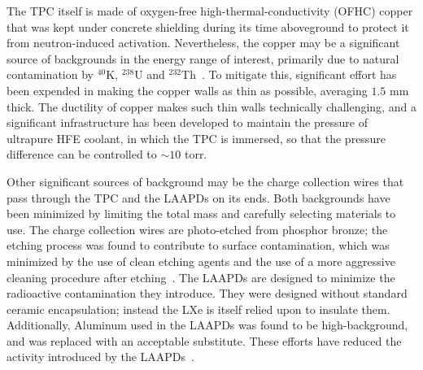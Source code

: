 The TPC itself is made of oxygen-free high-thermal-conductivity (OFHC) copper that was kept under concrete shielding during its time aboveground to protect it from neutron-induced activation.  Nevertheless, the copper may be a significant source of backgrounds in the energy range of interest, primarily due to natural contamination by $^{40}$K, $^{238}$U and $^{232}$Th~\cite{MaterialsCatalog}.  To mitigate this, significant effort has been expended in making the copper walls as thin as possible, averaging $1.5$ mm thick.  The ductility of copper makes such thin walls technically challenging, and a significant infrastructure has been developed to maintain the pressure of ultrapure HFE coolant, in which the TPC is immersed, so that the pressure difference can be controlled to $\sim 10$ torr.

Other significant sources of background may be the charge collection wires that pass through the TPC and the LAAPDs on its ends.  Both backgrounds have been minimized by limiting the total mass and carefully selecting materials to use.  The charge collection wires are photo-etched from phosphor bronze; the etching process was found to contribute to surface contamination, which was minimized by the use of clean etching agents and the use of a more aggressive cleaning procedure after etching~\cite{MaterialsCatalog}.  The LAAPDs are designed to minimize the radioactive contamination they introduce.  They were designed without standard ceramic encapsulation; instead the LXe is itself relied upon to insulate them.  Additionally, Aluminum used in the LAAPDs was found to be high-background, and was replaced with an acceptable substitute.  These efforts have reduced the activity introduced by the LAAPDs~\cite{MaterialsCatalog}\cite{EXOLAAPD}.

